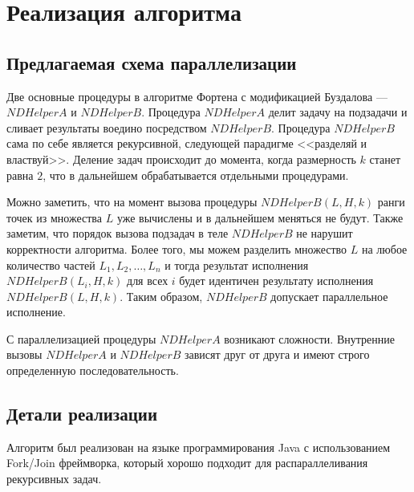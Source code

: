 \chapter{Реализация алгоритма}
\section{Предлагаемая схема параллелизации}
Две основные процедуры в алгоритме Фортена с модификацией Буздалова --- $NDHelperA$ и $NDHelperB$. Процедура $NDHelperA$ делит задачу на подзадачи и сливает результаты воедино посредством $NDHelperB$. Процедура $NDHelperB$ сама по себе является рекурсивной, следующей парадигме <<разделяй и властвуй>>. Деление задач происходит до момента, когда размерность $k$ станет равна $2$, что в дальнейшем обрабатывается отдельными процедурами.

Можно заметить, что на момент вызова процедуры $NDHelperB(L, H, k)$ ранги точек из множества $L$ уже вычислены и в дальнейшем меняться не будут. Также заметим, что порядок вызова подзадач в теле $NDHelperB$ не нарушит корректности алгоритма. Более того, мы можем разделить множество $L$ на любое количество частей ${L_1, L_2,\ldots, L_n}$ и тогда результат исполнения $NDHelperB(L_i, H, k)$ для всех $i$ будет идентичен результату исполнения $NDHelperB(L, H, k)$. Таким образом, $NDHelperB$ допускает параллельное исполнение.

С параллелизацией процедуры $NDHelperA$ возникают сложности. Внутренние вызовы $NDHelperA$ и $NDHelperB$ зависят друг от друга и имеют строго определенную последовательность. 

\section{Детали реализации}
Алгоритм был реализован на языке программирования Java с использованием Fork/Join фреймворка, который хорошо подходит для распараллеливания рекурсивных задач.

